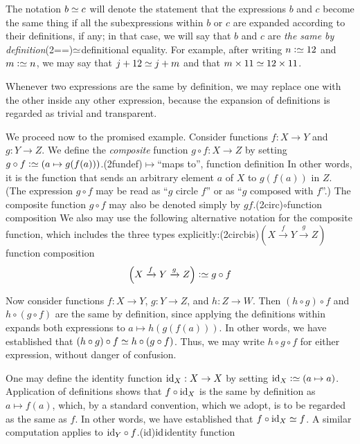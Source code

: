 The notation $b \jdeq c$ will denote the statement that the expressions $b$ and $c$ become the same thing if all the subexpressions within $b$
or $c$ are expanded according to their definitions, if any; in that case, we will say that $b$ and $c$ are \emph{the same by
definition}\glossary(2==){$\jdeq$}{definitional equality}.  For example, after writing $n \defeq 12$ and $m \defeq n$, we may say that $j + 12
\jdeq j + m$ and that $m \times 11 \jdeq 12 \times 11$.

Whenever two expressions are the same by definition, we may replace one with the other inside any other expression, because the expansion of
definitions is regarded as trivial and transparent.

We proceed now to the promised example.  Consider functions $f : X \to Y$ and $g : Y \to Z$.  We define the \emph{composite} function $g \circ f
: X \to Z$ by setting $g \circ f \defeq (a \mapsto g(f(a)))$.\glossary(2fundef){$\mapsto$}{``maps to'', function definition} In other words, it
is the function that sends an arbitrary element $a$ of $X$ to $g(f(a))$ in $Z$.  (The expression $g \circ f$ may be read as ``$g$ circle $f$''
or as ``$g$ composed with $f$''.)  The composite function $g \circ f$ may also be denoted simply by $gf$.\glossary(2circ){$\circ$}{function composition}
We also may use the following alternative notation for the composite function, which includes the three
types explicitly:\glossary(2circbis){$ ( X \xrightarrow f Y \xrightarrow g Z ) $}{function composition}
\[
  \left( X \xrightarrow f Y \xrightarrow g Z \right) \defeq g \circ f
\]

Now consider functions $f : X \to Y$, $g : Y \to Z$, and $h : Z \to W$.  Then $(h \circ g) \circ f$ and $h \circ (g \circ f)$ are the same by
definition, since applying the definitions within expands both expressions to $a \mapsto h(g(f(a)))$.  In other
words, we have established that $(h \circ g) \circ f \jdeq h \circ (g \circ f)$.  Thus, we may write $h \circ g \circ f$ for
either expression, without danger of confusion.

One may define the identity function $\mathord{\mathrm{id}}_X : X \to X$ by setting $\id_X \defeq (a \mapsto a)$.  Application of definitions shows that
$f \circ \mathord{\mathrm{id}}_X$ is the same by definition as $a \mapsto f(a)$, which, by a standard convention, which we adopt, is to be regarded as the same as $f$.  In
other words, we have established that $f \circ \id_X \jdeq f$.  A similar computation applies to $\mathord{\mathrm{id}}_Y \circ f$.\glossary(id){$\mathord{\mathrm{id}}$}{identity function}

